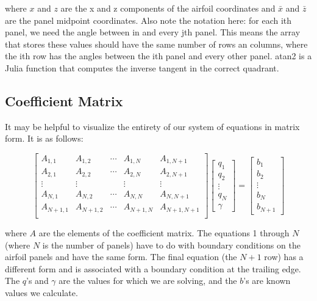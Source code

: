 \documentclass{article}%
\begin{document}
where $x$ and $z$ are the x and z components of the airfoil coordinates and $\bar{x}$ and $\bar{z}$ are the panel midpoint coordinates. Also note the notation here: for each ith panel, we need the angle between in and every jth panel. This means the array that stores these values should have the same number of rows an columns, where the ith row has the angles between the ith panel and every other panel. atan2 is a Julia function that computes the inverse tangent in the correct quadrant.

\subsection*{Coefficient Matrix}

It may be helpful to visualize the entirety of our system of equations in matrix form. It is as follows:

\begin{equation}
	\begin{bmatrix} 
	A_{1,1} & A_{1,2} & \cdots & A_{1,N} & A_{1,N+1} \\ 
	A_{2,1} & A_{2,2} & \cdots & A_{2,N} & A_{2,N+1} \\
	\vdots & \vdots &  & \vdots & \vdots \\
	A_{N,1} & A_{N,2} & \cdots & A_{N,N} & A_{N,N+1} \\
	A_{N+1,1} & A_{N+1,2} & \cdots & A_{N+1,N} & A_{N+1,N+1} \\
	\end{bmatrix}
	\begin{bmatrix}
	q_1\\
	q_2\\
	\vdots \\
	q_N \\
	\gamma
	\end{bmatrix}
	=
	\begin{bmatrix}
	b_1\\
	b_2\\
	\vdots \\
	b_N \\
	b_{N+1}
	\end{bmatrix}
\end{equation}

where $A$ are the elements of the coefficient matrix. The equations 1 through $N$ (where $N$ is the number of panels) have to do with boundary conditions on the airfoil panels and have the same form. The final equation (the $N+1$ row) has a different form and is associated with a boundary condition at the trailing edge. The $q$'s and $\gamma$ are the values for which we are solving, and the $b$'s are known values we calculate.
\end{document}
